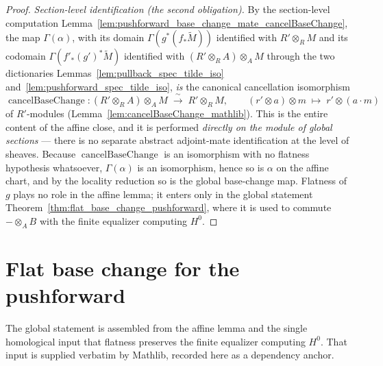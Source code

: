 \begin{proof}
  \medskip
  \emph{Section-level identification (the second obligation).} By the section-level
  computation Lemma~\ref{lem:pushforward_base_change_mate_cancelBaseChange}, the map
  \(\Gamma(\alpha)\), with its domain \(\Gamma(g^*(f_*\widetilde{M}))\) identified with
  \(R' \otimes_R M\) and its codomain \(\Gamma(f'_*(g')^*\widetilde{M})\) identified
  with \((R' \otimes_R A) \otimes_A M\) through the two dictionaries
  Lemmas~\ref{lem:pullback_spec_tilde_iso} and~\ref{lem:pushforward_spec_tilde_iso},
  \emph{is} the canonical cancellation isomorphism
  \[
    \operatorname{cancelBaseChange} :
    (R' \otimes_R A) \otimes_A M \;\xrightarrow{\ \sim\ }\; R' \otimes_R M,
    \qquad (r' \otimes a) \otimes m \;\mapsto\; r' \otimes (a \cdot m)
  \]
  of \(R'\)-modules (Lemma~\ref{lem:cancelBaseChange_mathlib}). This is the entire
  content of the affine close, and it is performed \emph{directly on the module of
  global sections} — there is no separate abstract adjoint-mate identification at the
  level of sheaves. Because \(\operatorname{cancelBaseChange}\) is an isomorphism with
  no flatness hypothesis whatsoever, \(\Gamma(\alpha)\) is an isomorphism, hence so is
  \(\alpha\) on the affine chart, and by the locality reduction so is the global
  base-change map. Flatness of \(g\) plays no role in the affine lemma; it enters only
  in the global statement Theorem~\ref{thm:flat_base_change_pushforward}, where it is
  used to commute \(- \otimes_A B\) with the finite equalizer computing \(H^0\).
\end{proof}

\section{Flat base change for the pushforward}

The global statement is assembled from the affine lemma and the single homological
input that flatness preserves the finite equalizer computing \(H^0\). That input is
supplied verbatim by Mathlib, recorded here as a dependency anchor.

